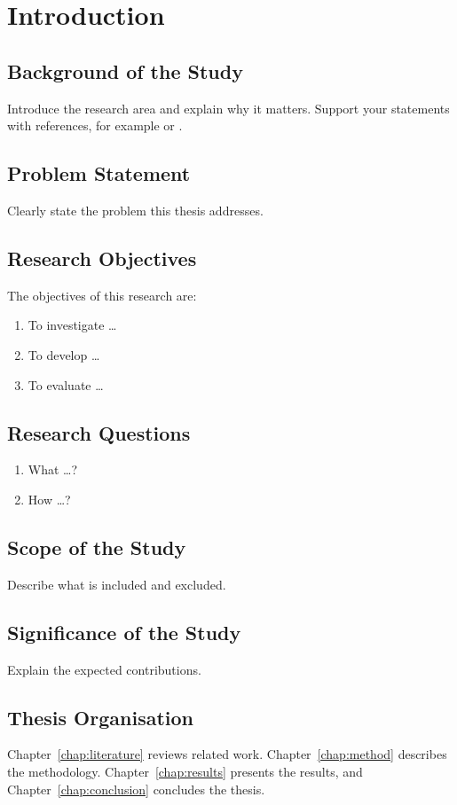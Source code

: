 \chapter{Introduction}
\label{chap:intro}

\section{Background of the Study}
Introduce the research area and explain why it matters. Support your statements with references, for example \textcite{creswell2018} or \parencite{kothari2004}.

\section{Problem Statement}
Clearly state the problem this thesis addresses.

\section{Research Objectives}
The objectives of this research are:
\begin{enumerate}[label=\arabic*.]
    \item To investigate \ldots
    \item To develop \ldots
    \item To evaluate \ldots
\end{enumerate}

\section{Research Questions}
\begin{enumerate}[label=RQ\arabic*.]
    \item What \ldots?
    \item How \ldots?
\end{enumerate}

\section{Scope of the Study}
Describe what is included and excluded.

\section{Significance of the Study}
Explain the expected contributions.

\section{Thesis Organisation}
Chapter~\ref{chap:literature} reviews related work. Chapter~\ref{chap:method} describes the methodology. Chapter~\ref{chap:results} presents the results, and Chapter~\ref{chap:conclusion} concludes the thesis.
